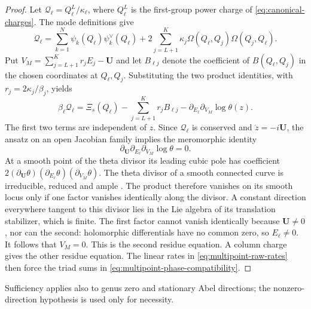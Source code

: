 \begin{proof}
Let $\mathcal Q_{\ell}=Q_{\ell}^L/\kappa_{\ell}$, where $Q_{\ell}^L$ is the first-group
power charge of \cref{eq:canonical-charges}. The mode definitions give
\[
 \mathcal Q_{\ell}=\sum_{k=1}^{N}\psi_k(Q_{\ell})\psi_k^\vee(Q_{\ell})
 +2\sum_{j=L+1}^{K}\kappa_j\Omega(Q_{\ell},Q_j)\Omega(Q_j,Q_{\ell}).
\]
Put $V_M=\sum_{j=L+1}^{K}r_jE_j-\boldsymbol U$ and let
$B_{\ell j}$ denote the coefficient of $B(Q_{\ell},Q_j)$ in the chosen
coordinates at $Q_{\ell},Q_j$. Substituting the two product identities,
with $r_j=2\kappa_j/\beta_j$, yields
\[
 \beta_{\ell}\mathcal Q_{\ell}
 =\Xi_s(Q_{\ell})-\sum_{j=L+1}^{K}r_jB_{\ell j}
       -\partial_{E_{\ell}}\partial_{V_M}\log\theta(z).
\]
The first two terms are independent of $z$. Since $\mathcal Q_{\ell}$ is
conserved and $\dot z=-i\boldsymbol U$, the ansatz on an open
Jacobian family implies the meromorphic identity
\[
 \partial_{\boldsymbol U}\partial_{E_{\ell}}\partial_{V_M}\log\theta=0.
\]
At a smooth point of the theta divisor its leading cubic pole has
coefficient
$2(\partial_{\boldsymbol U}\theta)(\partial_{E_{\ell}}\theta)
(\partial_{V_M}\theta)$. The theta divisor of a smooth connected
curve is irreducible, reduced and ample \cite{Mumford1984}.
The product therefore vanishes on its smooth locus only if one
factor vanishes identically along the divisor. A constant direction
everywhere tangent to this divisor lies in the Lie algebra of its
translation stabilizer, which is finite. The first factor cannot
vanish identically because $\boldsymbol U\ne0$, nor can the second:
holomorphic differentials have no common zero, so $E_{\ell}\ne0$.
It follows that $V_M=0$. This is the second residue equation.
A column charge gives the other residue equation. The linear rates
in \cref{eq:multipoint-raw-rates} then force the triad sums in
\cref{eq:multipoint-phase-compatibility}.
\end{proof}
Sufficiency applies also to genus zero and stationary Abel directions;
the nonzero-direction hypothesis is used only for necessity.

